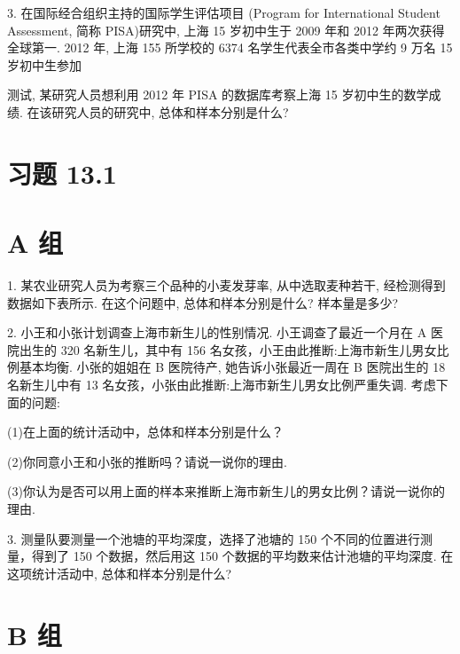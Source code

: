 \documentclass[10pt]{article}
\begin{document}
3. 在国际经合组织主持的国际学生评估项目 (Program for International Student Assessment, 简称 PISA)研究中, 上海 15 岁初中生于 2009 年和 2012 年两次获得全球第一. 2012 年, 上海 155 所学校的 6374 名学生代表全市各类中学约 9 万名 15 岁初中生参加



测试, 某研究人员想利用 2012 年 PISA 的数据库考察上海 15 岁初中生的数学成绩. 在该研究人员的研究中, 总体和样本分别是什么?

\section*{习题 13.1}

\section*{A 组}

1. 某农业研究人员为考察三个品种的小麦发芽率, 从中选取麦种若干, 经检测得到数据如下表所示. 在这个问题中, 总体和样本分别是什么? 样本量是多少?

\begin{center}
\end{center}

2. 小王和小张计划调查上海市新生儿的性别情况. 小王调查了最近一个月在 A 医院出生的 320 名新生儿，其中有 156 名女孩，小王由此推断:上海市新生儿男女比例基本均衡. 小张的姐姐在 B 医院待产, 她告诉小张最近一周在 B 医院出生的 18 名新生儿中有 13 名女孩，小张由此推断:上海市新生儿男女比例严重失调. 考虑下面的问题:

(1)在上面的统计活动中，总体和样本分别是什么？

(2)你同意小王和小张的推断吗？请说一说你的理由.

(3)你认为是否可以用上面的样本来推断上海市新生儿的男女比例？请说一说你的理由.

3. 测量队要测量一个池塘的平均深度，选择了池塘的 150 个不同的位置进行测量，得到了 150 个数据，然后用这 150 个数据的平均数来估计池塘的平均深度. 在这项统计活动中, 总体和样本分别是什么?

\section*{B 组}
\end{document}
